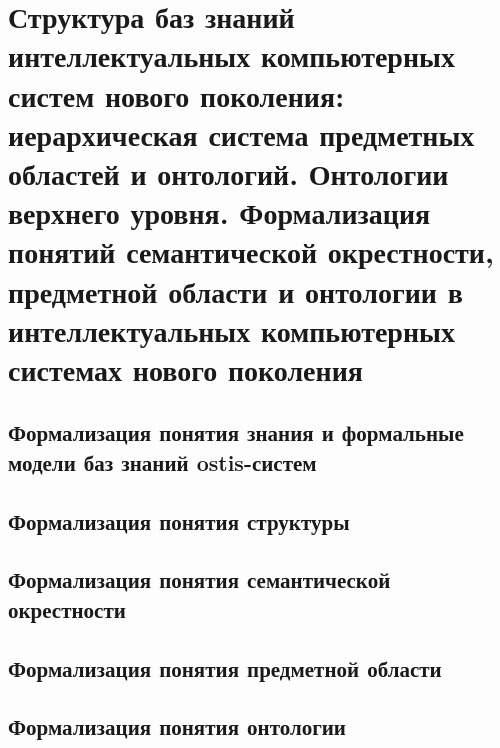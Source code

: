 \chapter{Структура баз знаний интеллектуальных компьютерных систем нового поколения: иерархическая система предметных областей и онтологий. Онтологии верхнего уровня. Формализация понятий семантической окрестности, предметной области и онтологии в интеллектуальных компьютерных системах нового поколения}
\label{chapter_kb}


\section{Формализация понятия знания и формальные модели баз знаний ostis-систем}
\section{Формализация понятия структуры}
\section{Формализация понятия семантической окрестности}
\section{Формализация понятия предметной области}
\section{Формализация понятия онтологии}

%